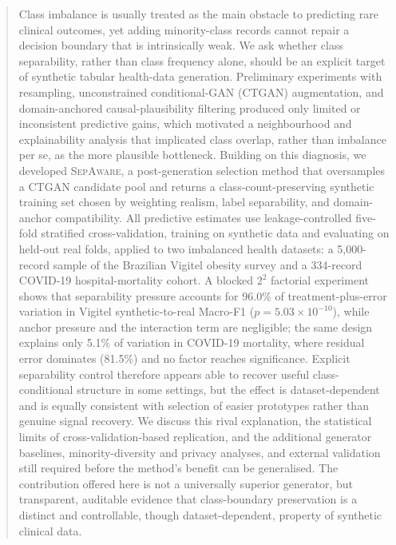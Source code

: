 \documentclass[review,12pt]{elsarticle}
\newcommand{\sepa}{\textsc{SepAware}}
\begin{document}
\begin{frontmatter}
\begin{abstract}
Class imbalance is usually treated as the main obstacle to predicting rare clinical outcomes, yet adding minority-class records cannot repair a decision boundary that is intrinsically weak. We ask whether class separability, rather than class frequency alone, should be an explicit target of synthetic tabular health-data generation. Preliminary experiments with resampling, unconstrained conditional-GAN (CTGAN) augmentation, and domain-anchored causal-plausibility filtering produced only limited or inconsistent predictive gains, which motivated a neighbourhood and explainability analysis that implicated class overlap, rather than imbalance per se, as the more plausible bottleneck. Building on this diagnosis, we developed \sepa{}, a post-generation selection method that oversamples a CTGAN candidate pool and returns a class-count-preserving synthetic training set chosen by weighting realism, label separability, and domain-anchor compatibility. All predictive estimates use leakage-controlled five-fold stratified cross-validation, training on synthetic data and evaluating on held-out real folds, applied to two imbalanced health datasets: a 5,000-record sample of the Brazilian Vigitel obesity survey and a 334-record COVID-19 hospital-mortality cohort. A blocked $2^2$ factorial experiment shows that separability pressure accounts for 96.0\% of treatment-plus-error variation in Vigitel synthetic-to-real Macro-F1 ($p=5.03\times10^{-10}$), while anchor pressure and the interaction term are negligible; the same design explains only 5.1\% of variation in COVID-19 mortality, where residual error dominates (81.5\%) and no factor reaches significance. Explicit separability control therefore appears able to recover useful class-conditional structure in some settings, but the effect is dataset-dependent and is equally consistent with selection of easier prototypes rather than genuine signal recovery. We discuss this rival explanation, the statistical limits of cross-validation-based replication, and the additional generator baselines, minority-diversity and privacy analyses, and external validation still required before the method's benefit can be generalised. The contribution offered here is not a universally superior generator, but transparent, auditable evidence that class-boundary preservation is a distinct and controllable, though dataset-dependent, property of synthetic clinical data.
\end{abstract}


\end{frontmatter}
\end{document}
